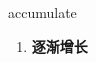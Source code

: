 
\begin{frame}
{\huge accumulate}
\begin{center}
\begin{enumerate}\Large
  \item \textbf{逐渐增长}
\end{enumerate}
\end{center}
\end{frame}
